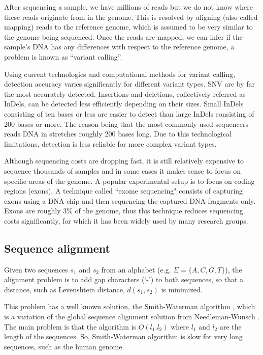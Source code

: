 After sequencing a sample, we have millions of reads but we do not know where these reads originate from in the genome. This is resolved by aligning (also called mapping) reads to the reference genome, which is assumed to be very similar to the genome being sequenced. Once the reads are mapped, we can infer if the sample’s DNA has any differences with respect to the reference genome, a problem is known as ``variant calling''. 

Using current technologies and computational methods for variant calling, detection accuracy varies significantly for different variant types. SNV are by far the most accurately detected. Insertions and deletions, collectively referred as InDels, can be detected less efficiently depending on their sizes. Small InDels consisting of ten bases or less are easier to detect than large InDels consisting of 200 bases or more. The reason being that the most commonly used sequencers reads DNA in stretches roughly 200 bases long. Due to this technological limitations, detection is less reliable for more complex variant types.

Although sequencing costs are dropping fast, it is still relatively expensive to sequence thousands of samples and in some cases it makes sense to focus on specific areas of the genome. A popular experimental setup is to focus on coding regions (exons). A technique called ``exome sequencing" consists of capturing exons using a DNA chip and then sequencing the captured DNA fragments only. Exons are roughly 3\% of the genome, thus this technique reduces sequencing costs significantly, for which it has been widely used by many research groups.

\subsection{Sequence alignment}

Given two sequences $s_1$ and $s_2$ from an alphabet (e.g. $\Sigma = \{A,C,G,T\}$), the alignment problem is to add gap characters (`-') to both sequences, so that a distance, such as Levenshtein distance, $d(s_1,s_2)$ is minimized.

This problem has a well known solution, the Smith-Waterman algorithm \cite{smith1981identification}, which is a variation of the global sequence alignment solution from Needleman-Wunsch \cite{needleman1970general}. The main problem is that the algorithm is $O(l_1 . l_2)$ where $l_1$ and $l_2$ are the length of the sequences. So, Smith-Waterman algorithm is slow for very long sequences, such as the human genome.

